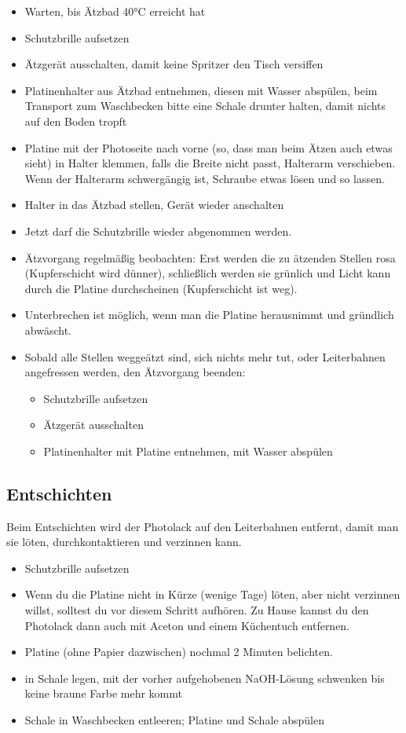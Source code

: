 \documentclass{\basedir/fablab-document}
\begin{document}
\begin{itemize}
\item Warten, bis Ätzbad 40°C erreicht hat
\item Schutzbrille aufsetzen
\item Ätzgerät ausschalten, damit keine Spritzer den Tisch versiffen
\item Platinenhalter aus Ätzbad entnehmen, diesen mit Wasser abspülen, beim Transport zum Waschbecken bitte eine Schale drunter halten, damit nichts auf den Boden tropft
\item Platine mit der Photoseite nach vorne (so, dass man beim Ätzen auch etwas sieht) in Halter klemmen, falls die Breite nicht passt, Halterarm verschieben. Wenn der Halterarm schwergängig ist, Schraube etwas lösen und so lassen.
\item Halter in das Ätzbad stellen, Gerät wieder anschalten
\item Jetzt darf die Schutzbrille wieder abgenommen werden.
\item Ätzvorgang regelmäßig beobachten: Erst werden die zu ätzenden Stellen rosa (Kupferschicht wird dünner), schließlich werden sie grünlich und Licht kann durch die Platine durchscheinen (Kupferschicht ist weg).
\item Unterbrechen ist möglich, wenn man die Platine herausnimmt und gründlich abwäscht.
\item Sobald alle Stellen weggeätzt sind, sich nichts mehr tut, oder Leiterbahnen angefressen werden, den Ätzvorgang beenden:
\begin{itemize}
 \item Schutzbrille aufsetzen
 \item Ätzgerät ausschalten
 \item Platinenhalter mit Platine entnehmen, mit Wasser abspülen
\end{itemize}
 
\end{itemize}

\subsection{Entschichten}
\label{sec:entschichten}
Beim Entschichten wird der Photolack auf den Leiterbahnen entfernt, damit man sie löten, durchkontaktieren und verzinnen kann.

\begin{itemize}
\item Schutzbrille aufsetzen
\item Wenn du die Platine nicht in Kürze (wenige Tage) löten, aber nicht verzinnen willst, solltest du vor diesem Schritt aufhören. Zu Hause kannst du den Photolack dann auch mit Aceton und einem Küchentuch entfernen.
\item Platine (ohne Papier dazwischen) nochmal 2 Minuten belichten.
\item in Schale legen, mit der vorher aufgehobenen NaOH-Lösung schwenken bis keine braune Farbe mehr kommt
\item Schale in Waschbecken entleeren; Platine und Schale abspülen
\end{itemize}
\end{document}
